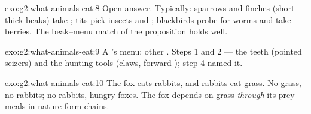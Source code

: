 \begin{solution}{exo:g2:what-animals-eat:8}
Open answer. Typically: sparrows and finches (short thick beaks)
take ; tits pick insects and ; blackbirds probe for
worms and take berries. The beak--menu match of the proposition
holds well.
\end{solution}

\begin{solution}{exo:g2:what-animals-eat:9}
A 's menu: other . Steps 1 and 2 --- the teeth
(pointed seizers) and the hunting tools (claws, forward );
step 4 named it.
\end{solution}

\begin{solution}{exo:g2:what-animals-eat:10}
The fox eats rabbits, and rabbits eat grass. No grass, no
rabbits; no rabbits, hungry foxes. The fox depends on grass
\emph{through} its prey --- meals in nature form chains.
\end{solution}
